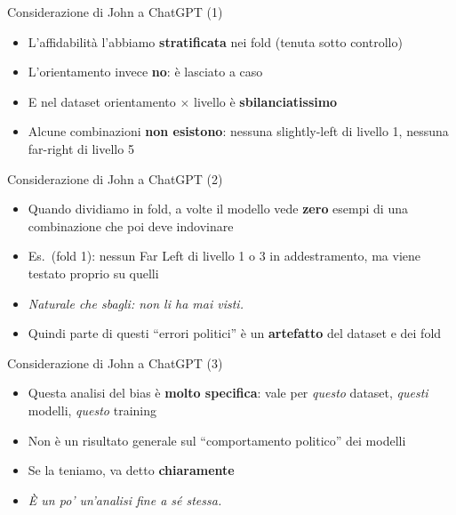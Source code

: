 \documentclass[aspectratio=169]{beamer}
\newcommand{\hl}[1]{\textbf{#1}}
\begin{document}
\begin{frame}{Considerazione di John a ChatGPT (1)}
  \vfill
  \begin{itemize}[<+->]
    \setlength\itemsep{0.8em}
    \item L'affidabilit\`a l'abbiamo \hl{stratificata} nei fold (tenuta sotto controllo)
    \item L'orientamento invece \hl{no}: \`e lasciato a caso
    \item E nel dataset orientamento $\times$ livello \`e \hl{sbilanciatissimo}
    \item Alcune combinazioni \hl{non esistono}: nessuna slightly-left di livello 1, nessuna far-right di livello 5
  \end{itemize}
  \vfill
\end{frame}

\begin{frame}{Considerazione di John a ChatGPT (2)}
  \vfill
  \begin{itemize}[<+->]
    \setlength\itemsep{0.8em}
    \item Quando dividiamo in fold, a volte il modello vede \hl{zero} esempi di una combinazione che poi deve indovinare
    \item Es.\ (fold 1): nessun Far Left di livello 1 o 3 in addestramento, ma viene testato proprio su quelli
    \item[] {\small\itshape Naturale che sbagli: non li ha mai visti.}
    \item Quindi parte di questi ``errori politici'' \`e un \hl{artefatto} del dataset e dei fold
  \end{itemize}
  \vfill
\end{frame}

\begin{frame}{Considerazione di John a ChatGPT (3)}
  \vfill
  \begin{itemize}[<+->]
    \setlength\itemsep{0.9em}
    \item Questa analisi del bias \`e \hl{molto specifica}: vale per \emph{questo} dataset, \emph{questi} modelli, \emph{questo} training
    \item Non \`e un risultato generale sul ``comportamento politico'' dei modelli
    \item Se la teniamo, va detto \hl{chiaramente}
    \item[] {\small\itshape \`E un po' un'analisi fine a s\'e stessa.}
  \end{itemize}
  \vfill
\end{frame}
\end{document}
